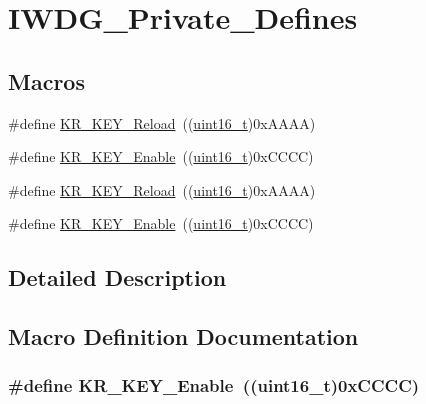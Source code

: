 \hypertarget{group___i_w_d_g___private___defines}{}\section{I\+W\+D\+G\+\_\+\+Private\+\_\+\+Defines}
\label{group___i_w_d_g___private___defines}
\subsection*{Macros}
\begin{DoxyCompactItemize}
\item 
\#define \hyperlink{group___i_w_d_g___private___defines_gad5e5efc1dbd6a045da5a36c3d9df16a5}{K\+R\+\_\+\+K\+E\+Y\+\_\+\+Reload}~((\hyperlink{_p_e___types_8h_a1f1825b69244eb3ad2c7165ddc99c956}{uint16\+\_\+t})0x\+A\+A\+A\+A)
\item 
\#define \hyperlink{group___i_w_d_g___private___defines_ga833138e20c8a26786dd7ca3b132152ed}{K\+R\+\_\+\+K\+E\+Y\+\_\+\+Enable}~((\hyperlink{_p_e___types_8h_a1f1825b69244eb3ad2c7165ddc99c956}{uint16\+\_\+t})0x\+C\+C\+C\+C)
\item 
\#define \hyperlink{group___i_w_d_g___private___defines_gad5e5efc1dbd6a045da5a36c3d9df16a5}{K\+R\+\_\+\+K\+E\+Y\+\_\+\+Reload}~((\hyperlink{_p_e___types_8h_a1f1825b69244eb3ad2c7165ddc99c956}{uint16\+\_\+t})0x\+A\+A\+A\+A)
\item 
\#define \hyperlink{group___i_w_d_g___private___defines_ga833138e20c8a26786dd7ca3b132152ed}{K\+R\+\_\+\+K\+E\+Y\+\_\+\+Enable}~((\hyperlink{_p_e___types_8h_a1f1825b69244eb3ad2c7165ddc99c956}{uint16\+\_\+t})0x\+C\+C\+C\+C)
\end{DoxyCompactItemize}


\subsection{Detailed Description}


\subsection{Macro Definition Documentation}
\subsubsection[{\texorpdfstring{K\+R\+\_\+\+K\+E\+Y\+\_\+\+Enable}{KR_KEY_Enable}}]{\setlength{\rightskip}{0pt plus 5cm}\#define K\+R\+\_\+\+K\+E\+Y\+\_\+\+Enable~(({\bf uint16\+\_\+t})0x\+C\+C\+C\+C)}\hypertarget{group___i_w_d_g___private___defines_ga833138e20c8a26786dd7ca3b132152ed}{}\label{group___i_w_d_g___private___defines_ga833138e20c8a26786dd7ca3b132152ed}


